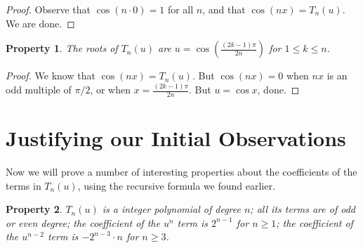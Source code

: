 \documentclass[12pt, letterpaper]{article} %
\newtheorem{theorem}{Property}
\begin{document}
\begin{proof}
Observe that $\cos (n \cdot 0) = 1$ for all $n$, and that $\cos (nx) = T_n(u)$. We are done.
\end{proof}

\begin{theorem}
The roots of $T_n(u)$ are $u = \cos \left(\frac{(2k-1)\pi}{2n}\right)$ for $1 \le k \le n$.
\end{theorem}

\begin{proof}
We know that $\cos (nx) = T_n(u)$. But $\cos (nx) = 0$ when $nx$ is an odd multiple of $\pi / 2$, or when $x = \frac{(2k-1)\pi}{2n}$. But $u = \cos x$, done.
\end{proof}

\newpage
\section{Justifying our Initial Observations}

Now we will prove a number of interesting properties about the coefficients of the terms in $T_n(u)$, using the recursive formula we found earlier. \\

\begin{theorem}
$T_n(u)$ is a integer polynomial of degree $n$; all its terms are of odd or even degree; the coefficient of the $u^n$ term is $2^{n-1}$ for $n \ge 1$; the coefficient of the $u^{n-2}$ term is $-2^{n-3}\cdot n$ for $n \ge 3$.
\end{theorem}
\end{document}
